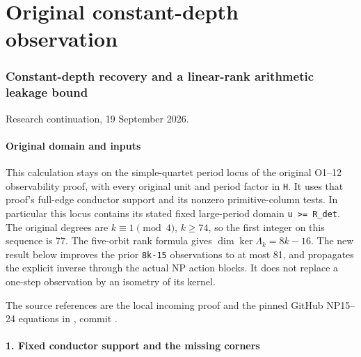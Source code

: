 

\clearpage\begingroup
\part*{Original constant-depth observation}
\providecommand{\pdepthtightlist}{\setlength{\itemsep}{0pt}\setlength{\parskip}{0pt}}
\newcommand{\pdepthdiag}{\operatorname{diag}}
\newcommand{\pdepthrank}{\operatorname{rank}}
\newcommand{\pdepthTr}{\operatorname{Tr}}

\section{Constant-depth recovery and a linear-rank arithmetic leakage bound}\label{pdepth:constant-depth-recovery-and-a-linear-rank-arithmetic-leakage-bound}

Research continuation, 19 September 2026.

\subsection{Original domain and inputs}\label{pdepth:original-domain-and-inputs}

This calculation stays on the simple-quartet period locus of the original O1--12 observability proof, with every original unit and period factor in \texttt{H}. It uses that proof's full-edge conductor support and its nonzero primitive-column tests. In particular this locus contains its stated fixed large-period domain \texttt{\textbar{}u\textbar{}\ \textgreater{}=\ R\_det}. The original degrees are \(k\equiv1\pmod4\), \(k\ge74\), so the first integer on this sequence is 77. The five-orbit rank formula gives \(\dim\ker\Lambda_k=8k-16\). The new result below improves the prior \texttt{8k-15} observations to at most 81, and propagates the explicit inverse through the actual NP action blocks. It does not replace a one-step observation by an isometry of its kernel.

The source references are the local incoming proof  and the pinned GitHub NP15--24 equations in , commit .

\subsection{1. Fixed conductor support and the missing corners}\label{pdepth:fixed-conductor-support-and-the-missing-corners}


